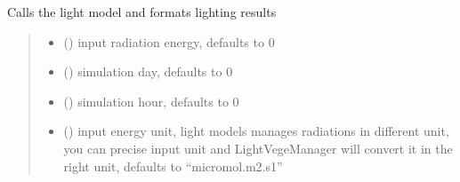 \documentclass[letterpaper,10pt,english]{sphinxmanual}
\begin{document}
\begin{fulllineitems}
\begin{fulllineitems}
\end{fulllineitems}


\begin{fulllineitems}
\label{\detokenize{reference:LVM.LightVegeManager.run}}
\pysigstartsignatures
{}
\pysigstopsignatures
\sphinxAtStartPar
Calls the light model and formats lighting results
\begin{quote}\begin{description}
\begin{itemize}
\item {} 
\sphinxAtStartPar
{} (\sphinxstyleliteralemphasis{\sphinxupquote{, }}) \textendash{} input radiation energy, defaults to 0

\item {} 
\sphinxAtStartPar
{} (\sphinxstyleliteralemphasis{\sphinxupquote{, }}) \textendash{} simulation day, defaults to 0

\item {} 
\sphinxAtStartPar
{} (\sphinxstyleliteralemphasis{\sphinxupquote{, }}) \textendash{} simulation hour, defaults to 0

\item {} 
\sphinxAtStartPar
{} (\sphinxstyleliteralemphasis{\sphinxupquote{, }}) \textendash{} input energy unit, light models manages radiations in different unit, you can precise input unit and LightVegeManager will convert it in the right unit, defaults to “micromol.m\sphinxhyphen{}2.s\sphinxhyphen{}1”


\end{itemize}
\end{description}
\end{quote}
\end{fulllineitems}
\end{fulllineitems}
\end{document}
